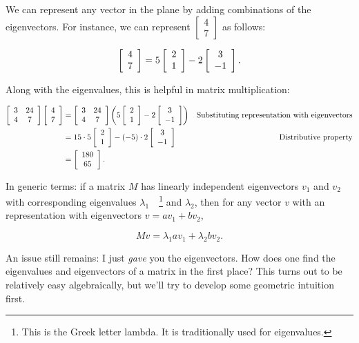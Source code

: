 \documentclass[../gatm.tex]{subfiles}
\begin{document}
We can represent any vector in the plane by adding combinations of the eigenvectors. For instance, we can represent $\left[\begin{smallmatrix} 4 \\ 7 \end{smallmatrix}\right]$ as follows:

$$\left[\begin{array}{c} 4 \\ 7 \end{array}\right] = 5\left[\begin{array}{c} 2 \\ 1 \end{array}\right] - 2\left[\begin{array}{c} 3 \\ -1 \end{array}\right].$$

Along with the eigenvalues, this is helpful in matrix multiplication:

\begin{align*}
\left[\begin{array}{cc} 3 & 24 \\ 4 & 7 \end{array}\right]\left[\begin{array}{c} 4 \\ 7 \end{array}\right]&=\left[\begin{array}{cc} 3 & 24 \\ 4 & 7 \end{array}\right]\left(5\left[\begin{array}{c} 2 \\ 1 \end{array}\right]-2\left[\begin{array}{c} 3 \\ -1 \end{array}\right]\right) & \text{Substituting representation with eigenvectors} \\
&= 15\cdot 5 \left[\begin{array}{c} 2 \\ 1 \end{array}\right] - (-5)\cdot 2 \left[\begin{array}{c} 3 \\ -1 \end{array}\right] & \text{Distributive property} \\
&= \left[\begin{array}{c} 180 \\ 65 \end{array}\right]. \\
\end{align*}

In generic terms: if a matrix $M$ has linearly independent eigenvectors $v_1$ and $v_2$ with corresponding eigenvalues $\lambda_1\quad$\footnote{This is the Greek letter lambda. It is traditionally used for eigenvalues.} and $\lambda_2$, then for any vector $v$ with an representation with eigenvectors $v=av_1+bv_2$,

$$Mv=\lambda_1av_1 + \lambda_2bv_2.$$

An issue still remains: I just \textit{gave} you the eigenvectors. How does one find the eigenvalues and eigenvectors of a matrix in the first place? This turns out to be relatively easy algebraically, but we'll try to develop some geometric intuition first.
\end{document}
